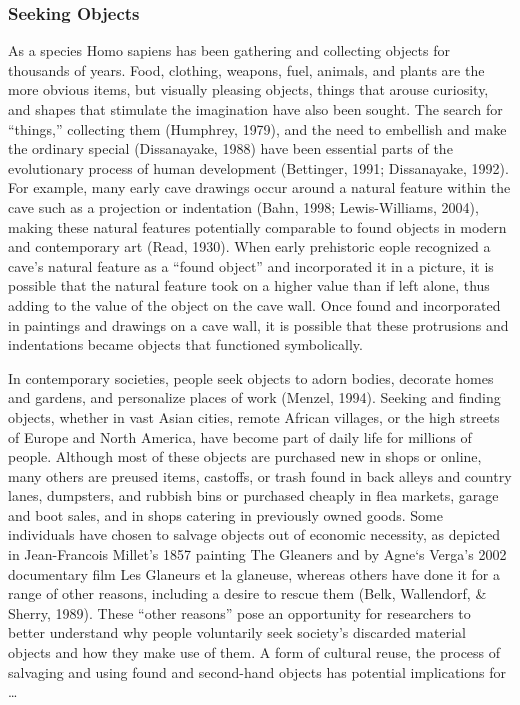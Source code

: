 \subsubsection{Seeking Objects}
As a species Homo sapiens has been gathering and collecting objects for thousands of years. Food, clothing, weapons, fuel, animals, and plants are the more obvious items, but visually pleasing objects, things that arouse curiosity, and shapes that stimulate the imagination have also been sought. The search for “things,” collecting them (Humphrey, 1979), and the need to embellish and make the ordinary special (Dissanayake, 1988) have been essential parts of the evolutionary process of human development (Bettinger, 1991; Dissanayake, 1992). For example, many early cave drawings occur around a natural feature within the cave such as a projection or indentation (Bahn, 1998; Lewis-Williams, 2004), making these natural features potentially comparable to found objects in modern and contemporary art (Read, 1930). When early prehistoric eople recognized a cave’s natural feature as a “found object” and incorporated it in a picture, it is possible that the natural feature took on a higher value than if left alone, thus adding to the value of the object on the cave wall. Once found and incorporated in paintings and drawings on a cave wall, it is possible that these protrusions and indentations became objects that functioned symbolically.

In contemporary societies, people seek objects to adorn bodies, decorate homes and gardens, and personalize places of work (Menzel, 1994). Seeking and finding objects, whether in vast Asian cities, remote African villages, or the high streets of Europe and North America, have become part of daily life for millions of people. Although most of these objects are purchased new in shops or online, many others are preused items, castoffs, or trash found in back alleys and country lanes, dumpsters, and rubbish bins or purchased cheaply in flea markets, garage and boot sales, and in shops catering in previously owned goods. Some individuals have chosen to salvage objects out of economic necessity, as depicted in Jean-Francois Millet’s 1857 painting The Gleaners and by Agne`s Verga’s 2002 documentary film Les Glaneurs et la glaneuse, whereas others have done it for a range of other reasons, including a desire to rescue them (Belk, Wallendorf, \& Sherry, 1989). These “other reasons” pose an opportunity for researchers to better understand why people voluntarily seek society’s discarded material objects and how they make use of them. A form of cultural reuse, the process
of salvaging and using found and second-hand objects has potential implications for \ldots 

